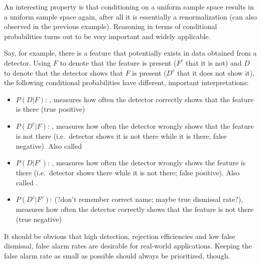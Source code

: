 An interesting property is that conditioning on a uniform sample space results in a uniform sample space again, after all it is essentially a renormalization (can also observed in the previous example). Reasoning in terms of conditional probabilities turns out to be very important and widely applicable.


Say, for example, there is a feature that potentially exists in data obtained from a detector. Using $F$ to denote that the feature is present ($F^c$ that it is not) and $D$ to denote that the detector shows that $F$ is present ($D^c$ that it does not show it)\footnotemark, the following conditional probabilities have different, important interpretations:
\begin{defi}
\begin{itemize}
\item $P(D | F)$: , measures how often the detector correctly shows that the feature is there (true positive)

\item $P(D^c | F)$: , measures how often the detector wrongly shows that the feature is not there (i.e.~detector shows it is not there while it is there; false negative). Also called 

\item $P(D | F^c)$: , measures how often the detector wrongly shows the feature is there (i.e.~detector shows there while it is not there; false positive). Also called .

\item $P(D^c | F^c)$:  (?don't remember correct name; maybe true dismissal rate?), measures how often the detector correctly shows that the feature is not there (true negative)
\end{itemize}
\end{defi}
It should be obvious that high detection, rejection efficiencies and low false dismissal, false alarm rates are desirable for real-world applications. Keeping the false alarm rate as small as possible should always be prioritized, though.



